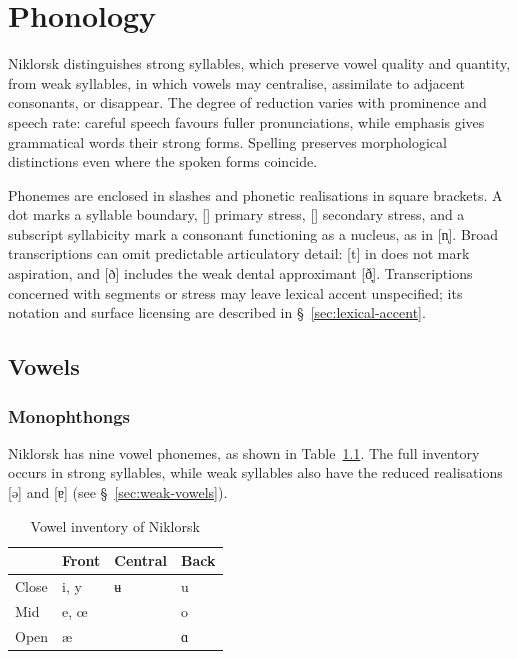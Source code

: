 \chapter{Phonology}
\label{chap:phonology}

Niklorsk distinguishes strong syllables, which preserve vowel quality and quantity, from weak syllables, in which vowels may centralise, assimilate to adjacent consonants, or disappear. The degree of reduction varies with prominence and speech rate: careful speech favours fuller pronunciations, while emphasis gives grammatical words their strong forms. Spelling preserves morphological distinctions even where the spoken forms coincide.

Phonemes are enclosed in slashes and phonetic realisations in square brackets. A dot marks a syllable boundary, [] primary stress, [] secondary stress, and a subscript syllabicity mark a consonant functioning as a nucleus, as in [n̩]. Broad transcriptions can omit predictable articulatory detail: [t] in  does not mark aspiration, and [ð] includes the weak dental approximant [ð̞]. Transcriptions concerned with segments or stress may leave lexical accent unspecified; its notation and surface licensing are described in \S~\ref{sec:lexical-accent}.

\section{Vowels}

\subsection{Monophthongs}

Niklorsk has nine vowel phonemes, as shown in Table~\ref{tab:vowel-inventory}. The full inventory occurs in strong syllables, while weak syllables also have the reduced realisations [ə] and [ɐ] (see \S~\ref{sec:weak-vowels}).

\begin{table}[!ht]
    \caption{Vowel inventory of Niklorsk}
    \label{tab:vowel-inventory}
    \begin{tabularx}{\textwidth}{X X X X}
        \toprule
        \rowcolor{grammarTableHead}
         & \textbf{Front} & \textbf{Central} & \textbf{Back} \\
        \midrule
        Close & i, y & ʉ & u \\
        Mid & e, œ & & o \\
        Open & æ & & ɑ \\
        \bottomrule
    \end{tabularx}
\end{table}

